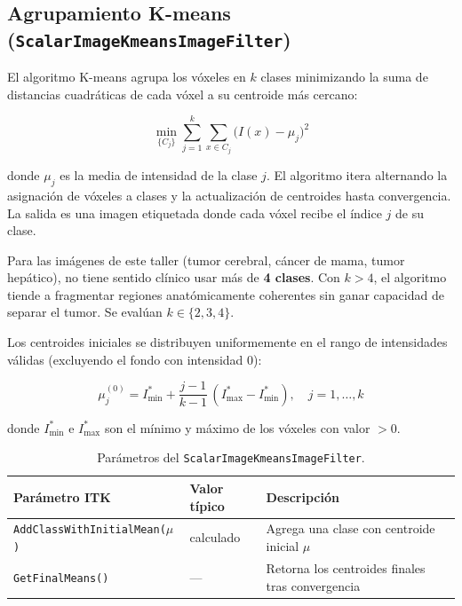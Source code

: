 \documentclass[12pt, a4paper]{article}
\begin{document}
\subsection{Agrupamiento K-means (\texttt{ScalarImageKmeansImageFilter})}

El algoritmo K-means agrupa los vóxeles en $k$ clases minimizando la suma de distancias
cuadráticas de cada vóxel a su centroide más cercano:

\begin{equation}
  \min_{\{C_j\}} \sum_{j=1}^{k} \sum_{x \in C_j} \bigl(I(x) - \mu_j\bigr)^2
  \label{eq:kmeans}
\end{equation}

donde $\mu_j$ es la media de intensidad de la clase $j$. El algoritmo itera
alternando la asignación de vóxeles a clases y la actualización de centroides hasta
convergencia. La salida es una imagen etiquetada donde cada vóxel recibe el índice $j$
de su clase.

\begin{tcolorbox}[warnstyle, title={Límite de clases para imágenes de patología}]
Para las imágenes de este taller (tumor cerebral, cáncer de mama, tumor hepático), no
tiene sentido clínico usar más de \textbf{4 clases}. Con $k > 4$, el algoritmo tiende a
fragmentar regiones anatómicamente coherentes sin ganar capacidad de separar el tumor.
Se evalúan $k \in \{2, 3, 4\}$.
\end{tcolorbox}

Los centroides iniciales se distribuyen uniformemente en el rango de intensidades válidas
(excluyendo el fondo con intensidad 0):

\begin{equation}
  \mu_j^{(0)} = I_{\min}^* + \frac{j-1}{k-1}\,(I_{\max}^* - I_{\min}^*),
  \quad j = 1, \ldots, k
  \label{eq:centroides_init}
\end{equation}

donde $I_{\min}^*$ e $I_{\max}^*$ son el mínimo y máximo de los vóxeles con valor $> 0$.

\begin{table}[H]
\centering
\renewcommand{\arraystretch}{1.3}
\begin{tabular}{llp{7cm}}
\toprule
\textbf{Parámetro ITK} & \textbf{Valor típico} & \textbf{Descripción} \\
\midrule
\texttt{AddClassWithInitialMean($\mu$)} & calculado & Agrega una clase con centroide inicial $\mu$ \\
\texttt{GetFinalMeans()} & — & Retorna los centroides finales tras convergencia \\
\bottomrule
\end{tabular}
\caption{Parámetros del \texttt{ScalarImageKmeansImageFilter}.}
\label{tab:kmeans_params}
\end{table}
\end{document}
